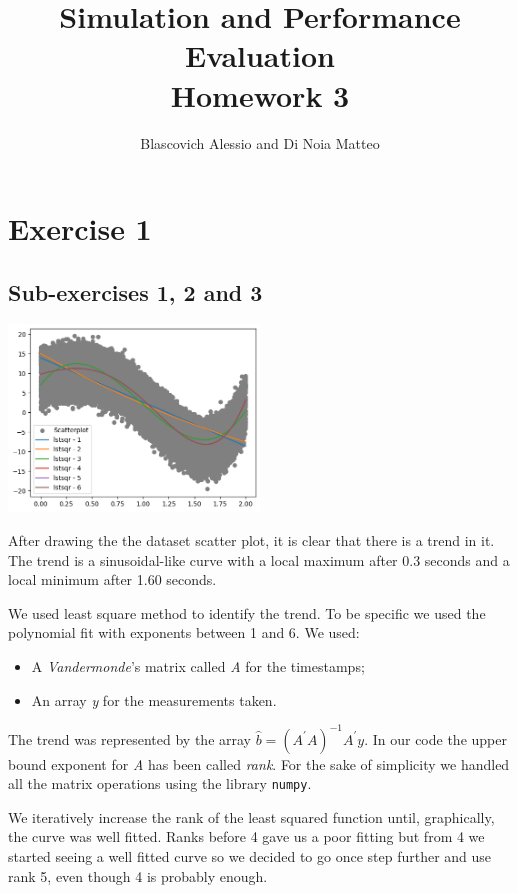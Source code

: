 \documentclass[10pt,a4paper]{article}
\title{
  {\Huge Simulation and Performance Evaluation}\\
  \huge Homework 3 \\
}
\author{Blascovich Alessio and Di Noia Matteo}
\begin{document}
\maketitle

\section*{Exercise 1}

\subsection*{Sub-exercises 1, 2 and 3}

\begin{center}
  \includegraphics[width=0.5\textwidth]{point1.png}
\end{center}

After drawing the the dataset scatter plot, it is clear that there is a trend in it. The trend is a sinusoidal-like curve with a local maximum after 0.3 seconds and a local minimum after 1.60 seconds. 

We used least square method to identify the trend. To be specific we used the polynomial fit with exponents between 1 and 6. We used:
\begin{itemize}
\item A \emph{Vandermonde}'s matrix called \emph{A} for the timestamps;
\item An array \emph{y} for the measurements taken.
\end{itemize}
The trend was represented by the array \(\hat{b} = (A^\prime A)^{-1} A^\prime y\). In our code the upper bound exponent for \emph{A} has been called \emph{rank}. For the sake of simplicity we handled all the matrix operations using the library \texttt{numpy}.

We iteratively increase the rank of the least squared function until, graphically, the curve was well fitted. Ranks before 4 gave us a poor fitting but from 4 we started seeing a well fitted curve so we decided to go once step further and use rank 5, even though 4 is probably enough.
\end{document}
